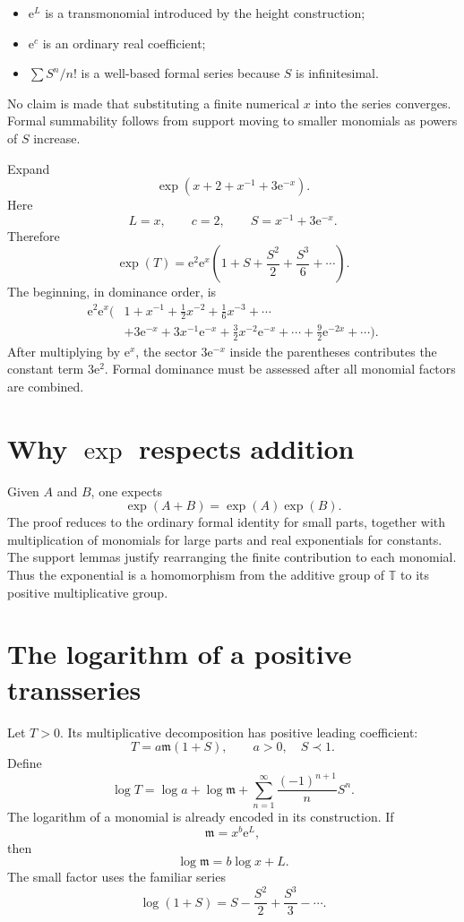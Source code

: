 \documentclass[11pt,openany]{book}
\theoremstyle{definition}
\theoremstyle{plain}
\theoremstyle{remark}
\newcommand{\T}{\mathbb{T}}
\newcommand{\m}{\mathfrak{m}}
\newcommand{\e}{\mathrm{e}}
\newcommand{\precdom}{\prec}
\begin{document}
\begin{itemize}
\item $\e^L$ is a transmonomial introduced by the height construction;
\item $\e^c$ is an ordinary real coefficient;
\item $\sum S^n/n!$ is a well-based formal series because $S$ is infinitesimal.
\end{itemize}

No claim is made that substituting a finite numerical $x$ into the series converges. Formal summability follows from support moving to smaller monomials as powers of $S$ increase.

\begin{workedbox}
Expand
\[
 \exp\!\left(x+2+x^{-1}+3\e^{-x}\right).
\]
Here
\[
 L=x,
 \qquad c=2,
 \qquad S=x^{-1}+3\e^{-x}.
\]
Therefore
\[
 \exp(T)=\e^2\e^x\left(1+S+\frac{S^2}{2}+\frac{S^3}{6}+\cdots\right).
\]
The beginning, in dominance order, is
\begin{align*}
 \e^2\e^x\biggl(&1+x^{-1}+\frac12x^{-2}+\frac16x^{-3}+\cdots\\
 &+3\e^{-x}+3x^{-1}\e^{-x}
 +\frac32x^{-2}\e^{-x}+\cdots
 +\frac92\e^{-2x}+\cdots\biggr).
\end{align*}
After multiplying by $\e^x$, the sector $3\e^{-x}$ inside the parentheses contributes the constant term $3\e^2$. Formal dominance must be assessed after all monomial factors are combined.
\end{workedbox}

\section{Why $\exp$ respects addition}

Given $A$ and $B$, one expects
\[
 \exp(A+B)=\exp(A)\exp(B).
\]
The proof reduces to the ordinary formal identity for small parts, together with multiplication of monomials for large parts and real exponentials for constants. The support lemmas justify rearranging the finite contribution to each monomial. Thus the exponential is a homomorphism from the additive group of $\T$ to its positive multiplicative group.

\section{The logarithm of a positive transseries}

Let $T>0$. Its multiplicative decomposition has positive leading coefficient:
\[
 T=a\m(1+S),
 \qquad a>0,\quad S\precdom1.
\]
Define
\begin{equation}\label{eq:formal-log-definition}
 \log T
 =\log a+\log\m
 +\sum_{n=1}^{\infty}\frac{(-1)^{n+1}}{n}S^n.
\end{equation}
The logarithm of a monomial is already encoded in its construction. If
\[
 \m=x^b\e^L,
\]
then
\begin{equation}\label{eq:log-monomial}
 \log\m=b\log x+L.
\end{equation}
The small factor uses the familiar series
\[
 \log(1+S)=S-\frac{S^2}{2}+\frac{S^3}{3}-\cdots.
\]
\end{document}
